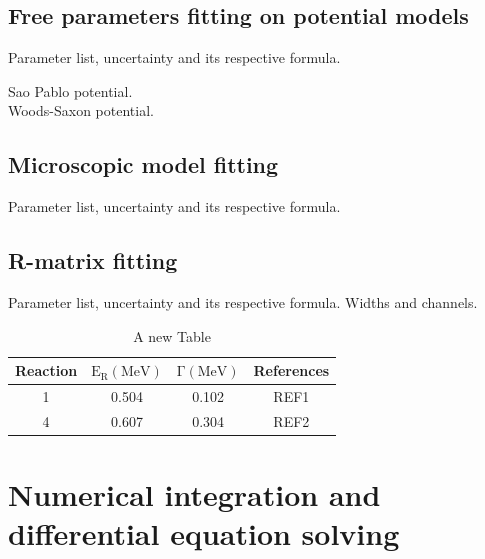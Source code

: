 \documentclass[openany]{book}
\begin{document}
\section{Free parameters fitting on potential models} \label{sec:potentialFitting}

Parameter list, uncertainty and its respective formula.

\cite{chamon_carlson_gasques_2021} Sao Pablo potential. \\

\cite{diaz-torres_2018} Woods-Saxon potential.

\section{Microscopic model fitting} \label{sec:microscopicFitting}

Parameter list, uncertainty and its respective formula.

\cite{gontchar_chushnyakova_2016}

\section{R-matrix fitting} \label{sec:rmatrixFitting}

Parameter list, uncertainty and its respective formula. Widths and channels.


\begin{table}[H]
	\centering
	\begin{tabular}{|c|c|c|c|}
		\hline
		Reaction & $\mathrm{E_R(MeV)}$ &  $\mathrm{\Gamma(MeV)}$ & References  \\  \hline
		1 &  0.504 & 0.102  & REF1  \\
 		4 &  0.607 & 0.304 & REF2 \\
 		\hline
	\end{tabular}
	\caption[R-matrix table]{A new Table}
	\label{table:fitting_rmatrix}
\end{table}



\cite{descouvemont_2016}
\cite{thompson_deboer_dimitriou_kunieda_pigni_arbanas_leeb_srdinko_hale_tamagno_et_2019}
\cite{azuma_uberseder_simpson_brune_costantini_deboer_gorres_heil_leblanc_ugalde_et_2010}

\chapter{Numerical integration and differential equation solving} \label{ap:numericalSolving}
\end{document}
